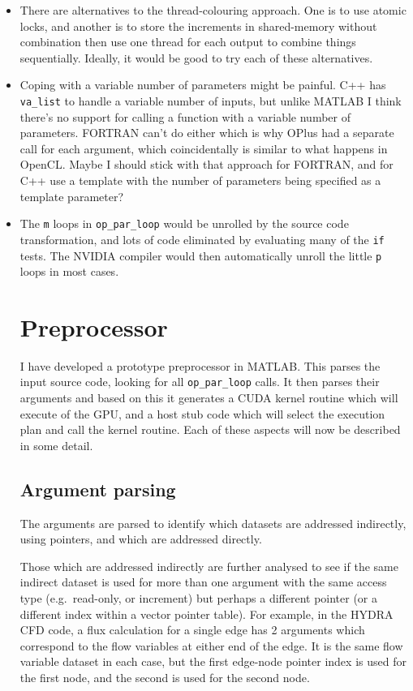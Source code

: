 \documentclass[12pt]{article}
\begin{document}
\begin{itemize}
\item
There are alternatives to the thread-colouring approach.  One is to use 
atomic locks, and another is to store the increments in shared-memory 
without combination then use one thread for each output to combine things
sequentially.  Ideally, it would be good to try each of these alternatives.

\item
Coping with a variable number of parameters might be painful.  C++ has 
{\tt va\_list} to handle a variable number of inputs, but unlike MATLAB 
I think there's no support for calling a function with a variable number 
of parameters.  FORTRAN can't do either which is why OPlus had a separate 
call for each argument, which coincidentally is similar to what happens in 
OpenCL.  Maybe I should stick with that approach for FORTRAN, and for C++ 
use a template with the number of parameters being specified as a template 
parameter?

\item
The {\tt m} loops in {\tt op\_par\_loop} would be unrolled by the source code 
transformation, and lots of code eliminated by evaluating many of the {\tt if} 
tests.  The NVIDIA compiler would then automatically unroll the little 
{\tt p} loops in most cases.



\newpage

\section{Preprocessor}

I have developed a prototype preprocessor in MATLAB.  This parses 
the input source code, looking for all {\tt op\_par\_loop} calls.
It then parses their arguments and based on this it generates a CUDA
kernel routine which will execute of the GPU, and a host stub code 
which will select the execution plan and call the kernel routine.
Each of these aspects will now be described in some detail.

\subsection{Argument parsing}

The arguments are parsed to identify which datasets are addressed 
indirectly, using pointers, and which are addressed directly.

Those which are addressed indirectly are further analysed to see
if the same indirect dataset is used for more than one argument
with the same access type (e.g.~read-only, or increment) but
perhaps a different pointer (or a different index within a 
vector pointer table).  For example, in the HYDRA CFD code, 
a flux calculation for a single edge has 2 arguments which 
correspond to the flow variables at either end of the edge. 
It is the same flow variable dataset in each case, but the 
first edge-node pointer index is used for the first node, and 
the second is used for the second node.


\end{itemize}
\end{document}
